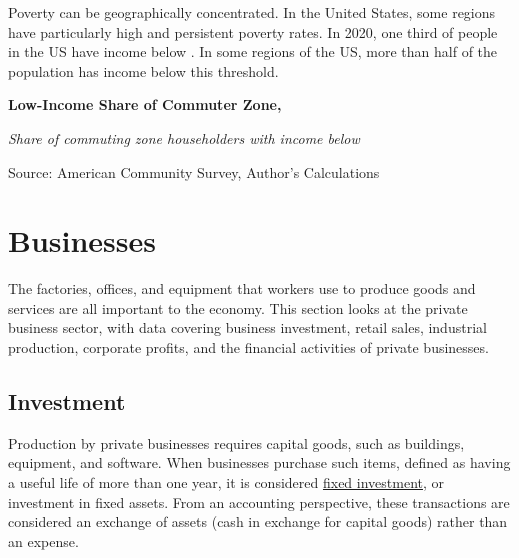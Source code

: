 \documentclass{report}
\newcommand{\tbllink}[1]{\href{https://raw.githubusercontent.com/bdecon/US-chartbook/master/chartbook/data/#1}{\faTable}}
\begin{document}
{\begin{minipage}{0.76\textwidth}
\small Poverty can be geographically concentrated. In the United States, some regions have particularly high and persistent poverty rates. In 2020, one third of people in the US have income below \unskip. In some regions of the US, more than half of the population has income below this threshold. 


\end{minipage}
\vspace{2mm}

\normalsize \textbf{Low-Income Share of Commuter Zone, }
\vspace{-2mm}

\footnotesize{\textit{Share of commuting zone householders with income below }}

\vspace{-1mm}
\hspace{-15mm} 

\vspace{-5mm}
\begin{minipage}{0.76\textwidth}
\footnotesize{Source: American Community Survey, Author's Calculations} \hfill \tbllink{low_income_cz.csv} 
\end{minipage}
\newpage
\vspace*{-9mm}

\hypertarget{bus}{\label{bus}}
\section*{Businesses}
\vspace*{-2mm}

\begin{minipage}{0.76\textwidth}  
\small The factories, offices, and equipment that workers use to produce goods and services are all important to the economy. This section looks at the private business sector, with data covering business investment, retail sales, industrial production, corporate profits, and the financial activities of private businesses. 

\subsection*{Investment}
\hypertarget{busin}{\label{busin}}
 
\small Production by private businesses requires capital goods, such as buildings, equipment, and software. When businesses purchase such items, defined as having a useful life of more than one year, it is considered \href{https://www.bea.gov/help/glossary/nonresidential-fixed-investment}{fixed investment}, or investment in fixed assets. From an accounting perspective, these transactions are considered an exchange of assets (cash in exchange for capital goods) rather than an expense.


\end{minipage}}
\end{document}
